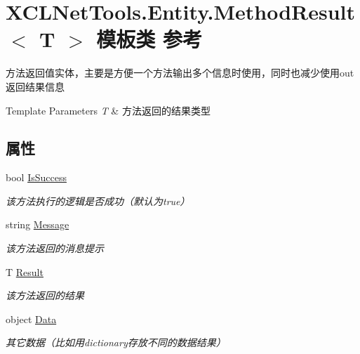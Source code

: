 \hypertarget{class_x_c_l_net_tools_1_1_entity_1_1_method_result_3_01_t_01_4}{\section{X\-C\-L\-Net\-Tools.\-Entity.\-Method\-Result$<$ T $>$ 模板类 参考}
\label{class_x_c_l_net_tools_1_1_entity_1_1_method_result_3_01_t_01_4}
}


方法返回值实体，主要是方便一个方法输出多个信息时使用，同时也减少使用out返回结果信息 
\begin{DoxyTemplParams}{Template Parameters}
{\em T} & 方法返回的结果类型\\
\hline
\end{DoxyTemplParams}
 


\subsection*{属性}
\begin{DoxyCompactItemize}
\item 
bool \hyperlink{class_x_c_l_net_tools_1_1_entity_1_1_method_result_3_01_t_01_4_a4add810cc3d83e1bab27f9cf0787376b}{Is\-Success}
\begin{DoxyCompactList}\small\item\em 该方法执行的逻辑是否成功（默认为true） \end{DoxyCompactList}\item 
string \hyperlink{class_x_c_l_net_tools_1_1_entity_1_1_method_result_3_01_t_01_4_a94580e5529a2d7f2cfce40060475c86d}{Message}
\begin{DoxyCompactList}\small\item\em 该方法返回的消息提示 \end{DoxyCompactList}\item 
T \hyperlink{class_x_c_l_net_tools_1_1_entity_1_1_method_result_3_01_t_01_4_a307672c2f6fc11705888fd90eb0cb86c}{Result}
\begin{DoxyCompactList}\small\item\em 该方法返回的结果 \end{DoxyCompactList}\item 
object \hyperlink{class_x_c_l_net_tools_1_1_entity_1_1_method_result_3_01_t_01_4_aa3fcbc6ffc0563dbed708b40c56658d2}{Data}
\begin{DoxyCompactList}\small\item\em 其它数据（比如用dictionary存放不同的数据结果） \end{DoxyCompactList}\end{DoxyCompactItemize}


